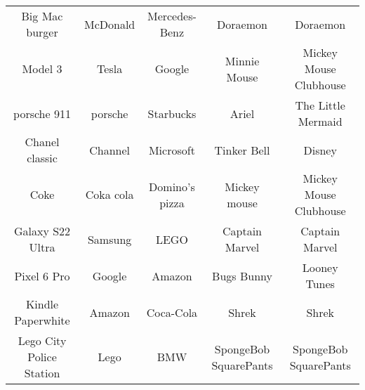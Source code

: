 \begin{table}[ht]
\begin{adjustbox}{width=1\linewidth}
\begin{tabular}{ccccc}
        \multicolumn{1}{c|}{Big Mac burger}                                                                  & \multicolumn{1}{c|}{McDonald}                      & \multicolumn{1}{c|}{Mercedes-Benz}  & \multicolumn{1}{c|}{Doraemon}              & Doraemon                   \\
        \multicolumn{1}{c|}{Model 3}                                                                         & \multicolumn{1}{c|}{Tesla}                         & \multicolumn{1}{c|}{Google}         & \multicolumn{1}{c|}{Minnie Mouse}          & Mickey Mouse Clubhouse     \\
        \multicolumn{1}{c|}{porsche 911}                                                                     & \multicolumn{1}{c|}{porsche}                       & \multicolumn{1}{c|}{Starbucks}      & \multicolumn{1}{c|}{Ariel}                 & The Little Mermaid         \\
        \multicolumn{1}{c|}{Chanel classic}                                                                  & \multicolumn{1}{c|}{Channel}                       & \multicolumn{1}{c|}{Microsoft}      & \multicolumn{1}{c|}{Tinker Bell}           & Disney                     \\
        \multicolumn{1}{c|}{Coke}                                                                            & \multicolumn{1}{c|}{Coka cola}                     & \multicolumn{1}{c|}{Domino's pizza} & \multicolumn{1}{c|}{Mickey mouse}          & Mickey Mouse Clubhouse     \\
        \multicolumn{1}{c|}{Galaxy S22 Ultra}                                                                & \multicolumn{1}{c|}{Samsung}                       & \multicolumn{1}{c|}{LEGO}           & \multicolumn{1}{c|}{Captain Marvel}        & Captain Marvel             \\
        \multicolumn{1}{c|}{Pixel 6 Pro}                                                                     & \multicolumn{1}{c|}{Google}                        & \multicolumn{1}{c|}{Amazon}         & \multicolumn{1}{c|}{Bugs Bunny}            & Looney Tunes               \\
        \multicolumn{1}{c|}{Kindle Paperwhite}                                                               & \multicolumn{1}{c|}{Amazon}                        & \multicolumn{1}{c|}{Coca-Cola}      & \multicolumn{1}{c|}{Shrek}                 & Shrek                      \\
        \multicolumn{1}{c|}{Lego City Police Station}                                                        & \multicolumn{1}{c|}{Lego}                          & \multicolumn{1}{c|}{BMW}            & \multicolumn{1}{c|}{SpongeBob SquarePants} & SpongeBob SquarePants      \\

\end{tabular}
\end{adjustbox}
\end{table}

